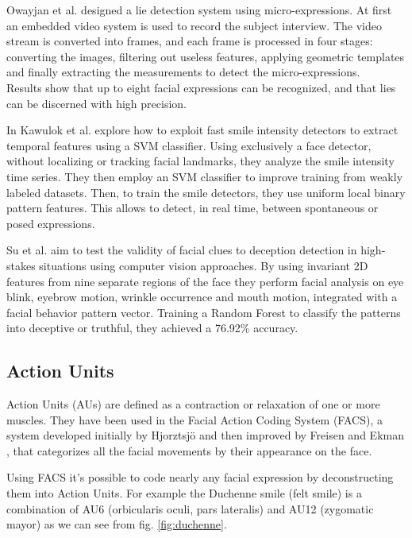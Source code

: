 
Owayjan et al. \cite{6462897} designed a lie detection system using micro-expressions. At first an embedded video system is used to record the subject interview. The video stream is converted into frames, and each frame is processed in four stages: converting the images, filtering out useless features, applying geometric templates and finally extracting the measurements to detect the micro-expressions. \\
Results show that up to eight facial expressions can be recognized, and that lies can be discerned with high precision.

In \cite{10.1007/978-3-319-47955-2_27} Kawulok et al. explore how to exploit fast smile intensity detectors to extract temporal features using a SVM classifier. Using exclusively a face detector, without localizing or tracking facial landmarks, they analyze the smile intensity time series. They then employ an SVM classifier to improve training from weakly labeled datasets. Then, to train the smile detectors, they use uniform local binary pattern features. This allows to detect, in real time, between spontaneous or posed expressions.

Su et al. \cite{SU201652} aim to test the validity of facial clues to deception detection in high-stakes situations using computer vision approaches. By using invariant 2D features from nine separate regions of the face they perform facial analysis on eye blink, eyebrow motion, wrinkle occurrence and mouth motion, integrated with a facial behavior pattern vector. Training a Random Forest to classify the patterns into deceptive or truthful, they achieved a 76.92\% accuracy.

\subsection{Action Units} \label{au}
Action Units (AUs) are defined as a contraction or relaxation of one or more muscles. They have been used in the Facial Action Coding System (FACS), a system developed initially by Hjorztsjö \cite{facsCH} and then improved by Freisen and Ekman \cite{facs1978}, that categorizes all the facial movements by their appearance on the face.

Using FACS it's possible to code nearly any facial expression by deconstructing them into Action Units. For example the Duchenne smile (felt smile) is a combination of AU6 (orbicularis oculi, pars lateralis) and AU12 (zygomatic mayor) as we can see from fig. \ref{fig:duchenne}.

